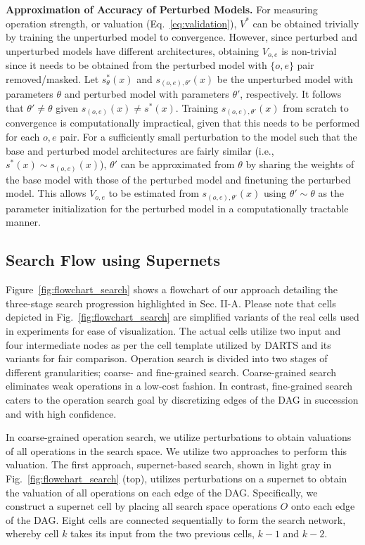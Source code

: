 \documentclass[onecolumn]{IEEEtran}
\begin{document}
\textbf{Approximation of Accuracy of Perturbed Models.} For measuring operation strength, or valuation (Eq.~\ref{eq:validation}), \( V^* \) can be obtained trivially by training the unperturbed model to convergence. However, since perturbed and unperturbed models have different architectures, obtaining \( V_{o,e} \) is non-trivial since it needs to be obtained from the perturbed model with \( \{o,e\} \) pair removed/masked. Let \( s^*_{\theta}(x) \) and \( s_{(o,e),\theta'}(x) \) be the unperturbed model with parameters \( \theta \) and perturbed model with parameters \( \theta' \), respectively. It follows that \( \theta' \neq \theta \) given \( s_{(o,e)}(x) \neq s^*(x) \). Training \( s_{(o,e),\theta'}(x) \) from scratch to convergence is computationally impractical, given that this needs to be performed for each \( o,e \) pair. For a sufficiently small perturbation to the model such that the base and perturbed model architectures are fairly similar (i.e., \( s^*(x) \sim s_{(o,e)}(x) \)), \( \theta' \) can be approximated from \( \theta \) by sharing the weights of the base model with those of the perturbed model and finetuning the perturbed model. This allows \( V_{o,e} \) to be estimated from \( s_{(o,e),\theta'}(x) \) using \( \theta' \sim \theta \) as the parameter initialization for the perturbed model in a computationally tractable manner.


\subsection{Search Flow using Supernets}
Figure~\ref{fig:flowchart_search} shows a flowchart of our approach detailing the three-stage search progression highlighted in Sec. II-A. Please note that cells depicted in Fig.~\ref{fig:flowchart_search} are simplified variants of the real cells used in experiments for ease of visualization. The actual cells utilize two input and four intermediate nodes as per the cell template utilized by DARTS \cite{Liu2018} and its variants \cite{Liu2018, Xu2019, Xie2018} for fair comparison. Operation search is divided into two stages of different granularities; coarse- and fine-grained search. Coarse-grained search eliminates weak operations in a low-cost fashion. In contrast, fine-grained search caters to the operation search goal by discretizing edges of the DAG in succession and with high confidence. 

In coarse-grained operation search, we utilize perturbations to obtain valuations of all operations in the search space. We utilize two approaches to perform this valuation. The first approach, supernet-based search, shown in light gray in Fig.~\ref{fig:flowchart_search} (top), utilizes perturbations on a supernet to obtain the valuation of all operations on each edge of the DAG. Specifically, we construct a supernet cell by placing all search space operations \( O \) onto each edge of the DAG. Eight cells are connected sequentially to form the search network, whereby cell \( k \) takes its input from the two previous cells, \( k-1 \) and \( k-2 \). 
\end{document}
